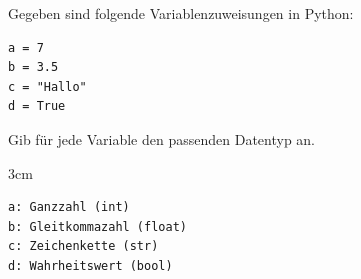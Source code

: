 \question[2]
Gegeben sind folgende Variablenzuweisungen in Python:
\begin{lstlisting}
a = 7
b = 3.5
c = "Hallo"
d = True
\end{lstlisting}
Gib für jede Variable den passenden Datentyp an.

\begin{solutionbox}{3cm}
\begin{lstlisting}
a: Ganzzahl (int)
b: Gleitkommazahl (float)
c: Zeichenkette (str)
d: Wahrheitswert (bool)
\end{lstlisting}
\end{solutionbox}